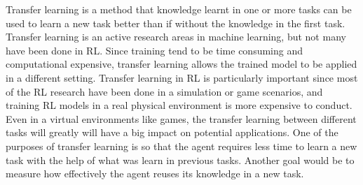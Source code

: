 \documentclass[11pt,twoside]{report}
\theoremstyle{plain}
\theoremstyle{definition}
\begin{document}
Transfer learning is a method that knowledge learnt in one or more tasks can be used to learn a new task better than if without the knowledge in the first task. Transfer learning is an active research areas in machine learning, but not many have been done in RL. Since training tend to be time consuming and computational expensive, transfer learning allows the trained model to be applied in a different setting. Transfer learning in RL is particularly important since most of the RL research have been done in a simulation or game scenarios, and training RL models in a real physical environment is more expensive to conduct. Even in a virtual environments like games, the transfer learning between different tasks will greatly will have a big impact on potential applications.
One of the purposes of transfer learning is so that the agent requires less time to learn a new task with the help of what was learn in previous tasks. Another goal would be to measure how effectively the agent reuses its knowledge in a new task.





\end{document}
